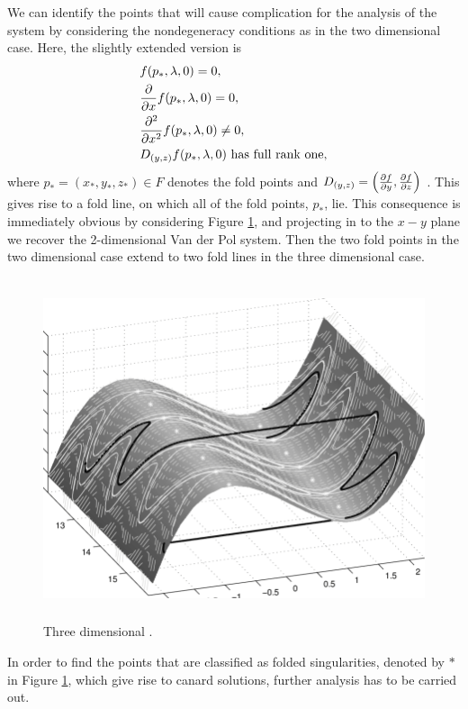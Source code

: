We can identify the points that will cause complication for the analysis of the system by considering the nondegeneracy conditions as in the two dimensional case. Here, the slightly extended version is
\begin{equation}
\begin{aligned}
&f(p_*,\lambda,0)=0,\\
&\pd{}{x}f(p_*,\lambda,0)=0,\\
&\pd{^2}{x^2}f(p_*,\lambda,0)\neq 0,\\
&D_{(y,z)}f(p_*,\lambda,0) \ \text{has full rank one},
\end{aligned}
\label{eq: non-degeneracy 3d system}
\end{equation}
where $ p_*=(x_*,y_*,z_*)\in F $  denotes the fold points and $ D_{(y,z)}=\left(\pd{f}{y},\pd{f}{z}\right) $  \citep{MMO}.
This gives rise to a fold line, on which all of the fold points, $p_*$, lie.
This consequence is immediately obvious by considering Figure \ref{fig: 3d folded singularity}, and projecting in to the $x-y$ plane we recover the 2-dimensional Van der Pol system. Then the two fold points in the two dimensional case extend to two fold lines in the three dimensional case.
\begin{figure}[h!]\centering
	\includegraphics[height=10cm,width=14cm]{Images/Three-dimensional-plot-of-a-trajectory-for-the-van-der-Pol-equation-and-the-critical}
	\caption{Three dimensional \vdp \citep{3D-VdP}.}
	\label{fig: 3d folded singularity}
\end{figure}\newpage
In order to find the points that are classified as folded singularities, denoted by $*$ in Figure \ref{fig: 3d folded singularity}, which give rise to canard solutions, further analysis has to be carried out.
